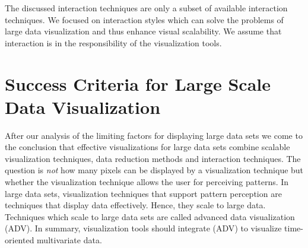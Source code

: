 The discussed interaction techniques are only a subset of available interaction techniques. We focused on interaction styles which can solve the problems of large data visualization and thus enhance visual scalability. We assume that interaction is in the responsibility of the visualization tools.



\section{Success Criteria for Large Scale Data Visualization}\label{success}
After our analysis of the limiting factors for displaying large data sets we come to the conclusion that effective visualizations for large data sets combine scalable visualization techniques, data reduction methods and interaction techniques. The question is \textit{not} how many pixels can be displayed by a visualization technique but whether the visualization technique allows the user for perceiving patterns. In large data sets, visualization techniques that support pattern perception are techniques that display data effectively. Hence, they scale to large data. Techniques which scale to large data sets are called advanced data visualization (\gls{ADV}). In summary, visualization tools should integrate (\gls{ADV}) to visualize time-oriented multivariate data. 

